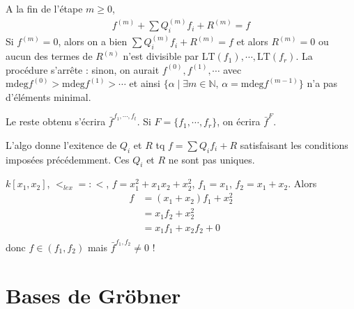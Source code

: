             \begin{remq}
                A la fin de l'étape $m \geq 0$,
                \begin{align*}
                    f^{(m)} + \sum Q_i^{(m)} f_i + R^{(m)} = f
                \end{align*}
                Si $f^{(m)} = 0$, alors on a bien $\sum Q_i^{(m)} f_i + R^{(m)} = f$ et alors $R^{(m)} = 0$ ou aucun des termes de $R^{(n)}$ n'est divisible par $\mathrm{LT}(f_1), \cdots, \mathrm{LT}(f_r)$. La procédure s'arrête : sinon, on aurait $f^{(0)},f^{(1)}, \cdots$ avec $\mathrm{mdeg} f^{(0)} > \mathrm{mdeg} f^{(1)} > \cdots$ et ainsi $\{\alpha \mid \exists m \in \mathbb{N} ,\, \alpha = \mathrm{mdeg} f^{(m-1)}\}$ n'a pas d'éléments minimal.
            \end{remq}
            \begin{nota}
                Le reste obtenu s'écrira $\bar f^{f_1, \cdots, f_t}$. Si $F = \{f_1, \cdots, f_r\}$, on écrira $\bar f^F$.
            \end{nota}
            \begin{remq}
                L'algo donne l'exitence de $Q_i$ et $R$ tq $f = \sum Q_if_i + R$ satisfaisant les conditions imposées précédemment. Ces $Q_i$ et $R$ ne sont pas uniques.
            \end{remq}
            \begin{expl}
                $k[x_1, x_2]$, $<_{lex} =: <$, $f = x_1^2 + x_1x_2 + x_2^2$, $f_1 = x_1$, $f_2 = x_1 + x_2$. Alors 
                \begin{align*}
                    f &= (x_1 + x_2)f_1 + x_2^2 \\
                    &= x_1f_2 + x_2^2 \\
                    &= x_1f_1 + x_2f_2 + 0 \\
                \end{align*}
                donc $f \in (f_1, f_2)$ mais $\bar f^{f_1, f_2} \neq 0$ !
            \end{expl}

    \section{Bases de Gröbner}
